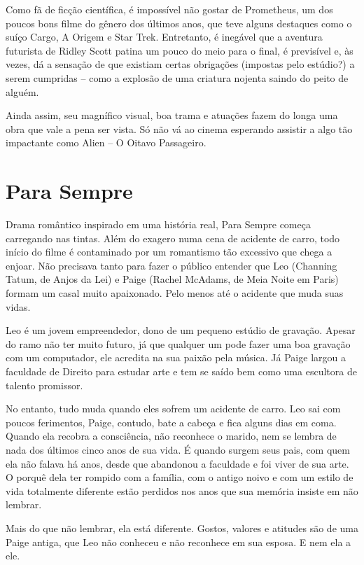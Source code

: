 \documentclass[a4paper,11pt,openright,openbib]{article}
\begin{document}
Como fã de ficção científica, é impossível não gostar de Prometheus, um dos poucos bons filme do gênero dos últimos anos, que teve alguns destaques como o suíço Cargo, A Origem e Star Trek. Entretanto, é inegável que a aventura futurista de Ridley Scott patina um pouco do meio para o final, é previsível e, às vezes, dá a sensação de que existiam certas obrigações (impostas pelo estúdio?) a serem cumpridas – como a explosão de uma criatura nojenta saindo do peito de alguém. 

Ainda assim, seu magnífico visual, boa trama e atuações fazem do longa uma obra que vale a pena ser vista. Só não vá ao cinema esperando assistir a algo tão impactante como Alien – O Oitavo Passageiro.

\section{Para Sempre}
Drama romântico inspirado em uma história real, Para Sempre começa carregando nas tintas. Além do exagero numa cena de acidente de carro, todo início do filme é contaminado por um romantismo tão excessivo que chega a enjoar. Não precisava tanto para fazer o público entender que Leo (Channing Tatum, de Anjos da Lei) e Paige (Rachel McAdams, de Meia Noite em Paris) formam um casal muito apaixonado. Pelo menos até o acidente que muda suas vidas.

Leo é um jovem empreendedor, dono de um pequeno estúdio de gravação. Apesar do ramo não ter muito futuro, já que qualquer um pode fazer uma boa gravação com um computador, ele acredita na sua paixão pela música. Já Paige largou a faculdade de Direito para estudar arte e tem se saído bem como uma escultora de talento promissor.

No entanto, tudo muda quando eles sofrem um acidente de carro. Leo sai com poucos ferimentos, Paige, contudo, bate a cabeça e fica alguns dias em coma. Quando ela recobra a consciência, não reconhece o marido, nem se lembra de nada dos últimos cinco anos de sua vida. É quando surgem seus pais, com quem ela não falava há anos, desde que abandonou a faculdade e foi viver de sua arte. O porquê dela ter rompido com a família, com o antigo noivo e com um estilo de vida totalmente diferente estão perdidos nos anos que sua memória insiste em não lembrar.

Mais do que não lembrar, ela está diferente. Gostos, valores e atitudes são de uma Paige antiga, que Leo não conheceu e não reconhece em sua esposa. E nem ela a ele.
\end{document}

